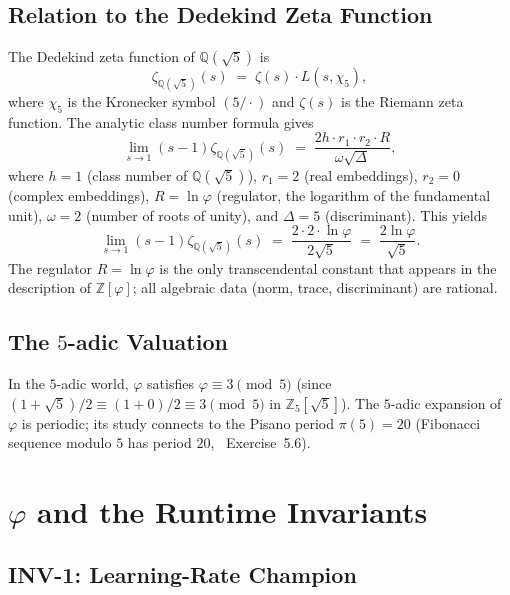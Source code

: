 \subsection{Relation to the Dedekind Zeta Function}

The Dedekind zeta function of $\mathbb{Q}(\sqrt{5})$ is
\[
  \zeta_{\mathbb{Q}(\sqrt{5})}(s) \;=\; \zeta(s) \cdot L(s, \chi_5),
\]
where $\chi_5$ is the Kronecker symbol $(5/\cdot)$ and $\zeta(s)$
is the Riemann zeta function.  The analytic class number formula gives
\[
  \lim_{s \to 1} (s-1) \zeta_{\mathbb{Q}(\sqrt{5})}(s)
  \;=\; \frac{2h \cdot r_1 \cdot r_2 \cdot R}{\omega \sqrt{\Delta}},
\]
where $h = 1$ (class number of $\mathbb{Q}(\sqrt{5})$),
$r_1 = 2$ (real embeddings), $r_2 = 0$ (complex embeddings),
$R = \ln\varphi$ (regulator, the logarithm of the fundamental unit),
$\omega = 2$ (number of roots of unity), and $\Delta = 5$
(discriminant).  This yields
\[
  \lim_{s \to 1} (s-1) \zeta_{\mathbb{Q}(\sqrt{5})}(s)
  \;=\; \frac{2 \cdot 2 \cdot \ln\varphi}{2\sqrt{5}} \;=\; \frac{2\ln\varphi}{\sqrt{5}}.
\]
The regulator $R = \ln\varphi$ is the only transcendental constant
that appears in the description of $\mathbb{Z}[\varphi]$;
all algebraic data (norm, trace, discriminant) are rational.

\subsection{The $5$-adic Valuation}

In the $5$-adic world, $\varphi$ satisfies $\varphi \equiv 3 \pmod{5}$
(since $(1+\sqrt{5})/2 \equiv (1+0)/2 \equiv 3 \pmod{5}$ in
$\mathbb{Z}_5[\sqrt{5}]$).  The $5$-adic expansion of $\varphi$
is periodic; its study connects to the Pisano period $\pi(5) = 20$
(Fibonacci sequence modulo $5$ has period $20$,
\cite{hardywright}~Exercise~5.6).


\section{$\varphi$ and the Runtime Invariants}
\label{sec:monad-invariants}

\subsection{INV-1: Learning-Rate Champion}

